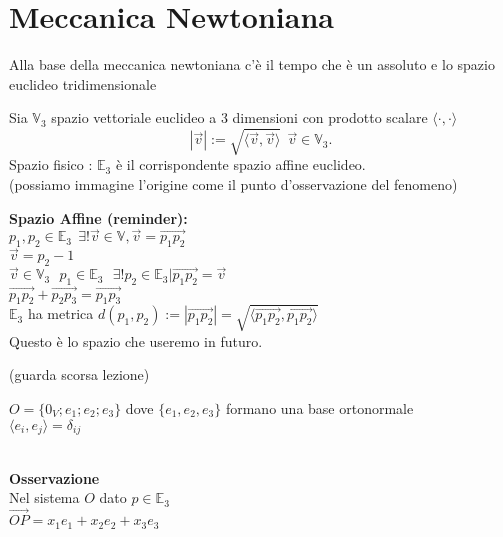 \documentclass{article}
\begin{document}
	\section{Meccanica Newtoniana}
	Alla base della meccanica newtoniana c'è il tempo che è un assoluto e lo spazio euclideo tridimensionale\\
	\begin{defi}
	Sia $\mathbb V_3 $ spazio vettoriale euclideo a 3 dimensioni con prodotto scalare $\langle \cdot, \cdot \rangle $\\
	\[
		| \overrightarrow{v}| :=\sqrt{ \langle \overrightarrow{v}, \overrightarrow{v} \rangle } \ \ \overrightarrow{v}\in\mathbb V_3
	.\] 
	Spazio fisico : $\mathbb E_3$ è il corrispondente spazio affine euclideo.\\(possiamo immagine l'origine come il punto d'osservazione del fenomeno)
	\end{defi}
	\textbf{Spazio Affine (reminder):}\\
	$p_1,p_2\in\mathbb E_3 \ \ \exists ! \overrightarrow{v}\in\mathbb V, \overrightarrow{v}= \overrightarrow{p_1p_2}$ \\
	$\overrightarrow{v} = p_2 - 1$\\
	$\overrightarrow{v}\in \mathbb V_3\ \ \ p_1\in \mathbb E_3\ \ \ \exists! p_2\in \mathbb E_3 | \overrightarrow{p_1p_2} = \overrightarrow{v}$\\
	$ \overrightarrow{p_1p_2} + \overrightarrow{p_2p_3} = \overrightarrow{p_1p_3}$ \\
	$\mathbb E_3$ ha metrica $d(p_1,p_2) := | \overrightarrow{p_1p_2}| = \sqrt{ \langle \overrightarrow{p_1p_2}, \overrightarrow{p_1p_2} \rangle }$\\
	Questo è lo spazio che useremo in futuro.\\
	\begin{defi}
		(guarda scorsa lezione)
	\end{defi}
	\begin{defi}
		$O =\{0_V; e_1;e_2;e_3\}$ dove $\{e_1,e_2,e_3\}$ formano una base ortonormale \\$ \langle e_i, e_j \rangle  = \delta_{ij}$\\\

	\end{defi}
	\textbf{Osservazione}\\
	Nel sistema $O$ dato $p\in\mathbb E_3$ \\
	$ \overrightarrow{OP} = x_1e_1 + x_2e_2 + x_3e_3$\\
\end{document}
